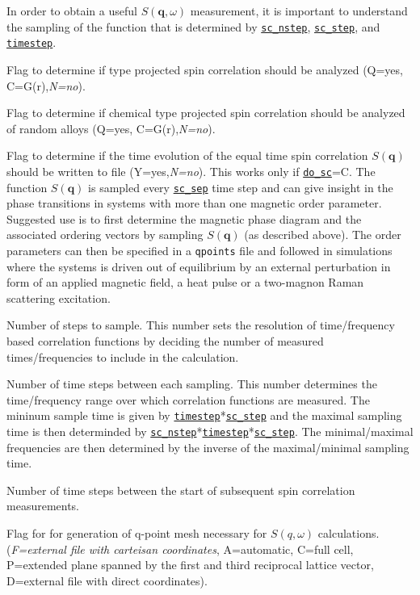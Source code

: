 \documentclass[11pt,fleqn,a4]{book} %
\makeatletter
\newcommand{\litem}[1]{\item[\bfseries#1\index{#1@\texttt{#1}}\label{#1}]}
\newcommand{\rkeyword}[1]{\hyperref[#1]{\texttt{#1}}}
\makeatother
\begin{document}
\begin{description}[leftmargin=!,labelwidth=\widthof{\bfseries fifteenchars}]
In order to obtain a useful $S(\mathbf{q},\omega)$ measurement, it is important to understand the sampling of the function that is determined by \rkeyword{sc_nstep}, \rkeyword{sc_step}, and \rkeyword{timestep}.
\litem{do_sc_proj} Flag to determine if type projected spin correlation should be analyzed (Q=yes, C=G(r),\emph{N=no}). 
\litem{do_sc_projch} Flag to determine if chemical type projected spin correlation should be analyzed of random alloys (Q=yes, C=G(r),\emph{N=no}). 
\litem{do_qt_traj} Flag to determine if the time evolution of the equal time spin correlation $S(\mathbf{q})$ should be written to file (Y=yes,\emph{N=no}). This works only if \rkeyword{do_sc}=C. The function $S(\mathbf{q})$ is sampled every \rkeyword{sc_sep} time step and can give insight in the phase transitions in systems with more than one magnetic order parameter. Suggested use is to first determine the magnetic phase diagram and the associated ordering vectors by sampling $S(\mathbf{q})$ (as described above). The 
 order parameters can then be specified in a \texttt{qpoints} file and followed in simulations where the systems is driven out of equilibrium by an external perturbation in form of an applied magnetic field, a heat pulse or a two-magnon Raman scattering excitation.
\litem{sc_nstep} Number of steps to sample. This number sets the resolution of time/frequency based correlation functions by deciding the number of measured times/frequencies to include in the calculation.
\litem{sc_step} Number of time steps between each sampling. This number determines the time/frequency range over which correlation functions are measured. The mininum sample time is given by \rkeyword{timestep}*\rkeyword{sc_step} and the maximal sampling time is then determinded by \rkeyword{sc_nstep}*\rkeyword{timestep}*\rkeyword{sc_step}. The minimal/maximal frequencies are then determined by the inverse of the maximal/minimal sampling time. 
\litem{sc_sep} Number of time steps between the start of subsequent spin correlation measurements.
\litem{qpoints} Flag for for generation of q-point mesh necessary for $S(q,\omega)$ calculations. (\emph{F=external file with carteisan coordinates}, A=automatic, C=full cell, P=extended plane spanned by the first and third reciprocal lattice vector, D=external file with direct coordinates).

\end{description}
\end{document}
